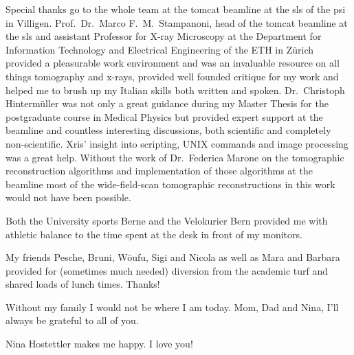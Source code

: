 Special thanks go to the whole team at the \acs{tomcat} beamline at the \acl{sls} of the \acl{psi} in Villigen. Prof.\ Dr.\ Marco F.\ M.\ Stampanoni, head of the \acs{tomcat} beamline at the \acl{sls} and assistant Professor for X-ray Microscopy at the Department for Information Technology and Electrical Engineering of the ETH in Zürich provided a pleasurable work environment and was an invaluable resource on all things tomography and x-rays, provided well founded critique for my work and helped me to brush up my Italian skills both written and spoken. Dr.\ Christoph Hintermüller was not only a great guidance during my Master Thesis for the postgraduate course in Medical Physics but provided expert support at the beamline and countless interesting discussions, both scientific and completely non-scientific. Xris' insight into scripting, UNIX commands and image processing was a great help. Without the work of Dr.\ Federica Marone on the tomographic reconstruction algorithms and implementation of those algorithms at the beamline most of the wide-field-scan tomographic reconstructions in this work would not have been possible.

Both the University sports Berne and the Velokurier Bern provided me with athletic balance to the time spent at the desk in front of my monitors.

My friends Pesche, Bruni, Wöufu, Sigi and Nicola as well as Mara and Barbara provided for (sometimes much needed) diversion from the academic turf and shared loads of lunch times. Thanks!

Without my family I would not be where I am today. Mom, Dad and Nina, I'll always
be grateful to all of you.

Nina  Hostettler makes me happy. I love you!
\endgroup